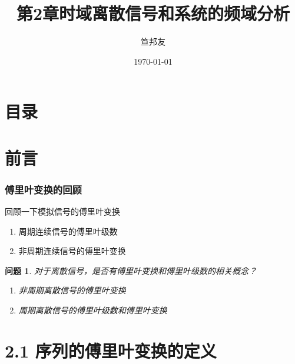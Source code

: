 \documentclass[notheorems,compress,mathserif,table]{beamer}
\title{\heiti 第2章\quad 时域离散信号和系统的频域分析}
\author[\textcolor{blue}]{{\sihao\kaishu  笪邦友}}
\institute{\sihao\lishu  \textcolor{violet}{中南民族大学~~ 电子信息工程学院}}
\date{\fangsong\today}
\newtheorem{dablock}{}
\newtheorem{wenti}{问题}
\begin{document}
\kaishu
\frame{ \titlepage }
\section*{目录}
\section*{前言}
\begin{frame}[shrink]\frametitle{\kaishu 傅里叶变换的回顾}%
回顾一下模拟信号的傅里叶变换

\begin{enumerate}
	\item [(1)] 周期连续信号的傅里叶级数
	\item [(2)] 非周期连续信号的傅里叶变换
\end{enumerate}
\pause
\begin{wenti}
	对于离散信号，是否有傅里叶变换和傅里叶级数的相关概念？
	\pause
	\begin{enumerate}
		\item 非周期离散信号的傅里叶变换
		\item 周期离散信号的傅里叶级数和傅里叶变换
	\end{enumerate}
\end{wenti}
\end{frame}
\section{2.1 序列的傅里叶变换的定义}

\end{document}
